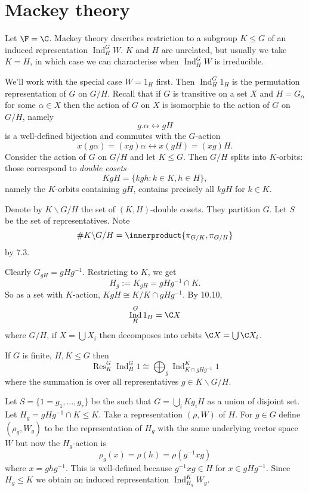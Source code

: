\documentclass[a4paper]{article}
\newcommand*{\ip}{\innerproduct} %
\DeclareMathOperator{\Res}{Res} %
\DeclareMathOperator{\Ind}{Ind} %
\theoremstyle{definition}
\begin{document}
\section{Mackey theory}

Let \(\F = \C\). Mackey theory describes restriction to a subgroup \(K \leq G\) of an induced representation \(\Ind_H^G W\). \(K\) and \(H\) are unrelated, but usually we take \(K = H\), in which case we can characterise when \(\Ind_H^G W\) is irreducible.

We'll work with the special case \(W = 1_H\) first. Then \(\Ind_H^G 1_H\) is the permutation representation of \(G\) on \(G/H\). Recall that if \(G\) is transitive on a set \(X\) and \(H = G_\alpha\) for some \(\alpha \in X\) then the action of \(G\) on \(X\) is isomorphic to the action of \(G\) on \(G/H\), namely
\[
  g . \alpha \leftrightarrow gH
  \tag{*, 12. 1}
\]
is a well-defined bijection and commutes with the \(G\)-action
\[
  x(g\alpha) = (xg) \alpha \leftrightarrow x(gH) = (xg)H.
\]
Consider the action of \(G\) on \(G/H\) and let \(K \leq G\). Then \(G/H\) splits into \(K\)-orbits: those correspond to \emph{double cosets}
\[
  KgH = \{kgh: k \in K, h \in H\},
\]
namely the \(K\)-orbits containing \(gH\), contains precisely all \(kgH\) for \(k \in K\).

\begin{notation}
  Denote by \(K \backslash G/H\) the set of \((K, H)\)-double cosets. They partition \(G\). Let \(S\) be the set of representatives. Note
  \[
    \# K \backslash G /H = \ip{\pi_{G/K}, \pi_{G/H}}
  \]
  by 7.3.
\end{notation}

  Clearly \(G_{gH} = gHg^{-1}\). Restricting to \(K\), we get
  \[
    H_g := K_{gH} = gHg^{-1} \cap K.
  \]
  So as a set with \(K\)-action, \(KgH \cong K/K \cap gHg^{-1}\). By 10.10,
  \[
    \Ind_H^G 1_H = \C X
  \]
where \(G/H\), if \(X = \bigcup X_i\) then decomposes into orbits \(\C X = \bigcup \C X_i\).

\begin{proposition}
  If \(G\) is finite, \(H, K \leq G\) then
  \[
    \Res_K^G \Ind_H^G 1 \cong \bigoplus_g \Ind_{K \cap gHg^{-1}}^K 1
  \]
  where the summation is over all representatives \(g \in K \backslash G/H\).
\end{proposition}

Let \(S = \{1 = g_1, \dots, g_r\}\) be the such that \(G = \bigcup_i Kg_iH\) as a union of disjoint set. Let \(H_g = gHg^{-1} \cap K \leq K\). Take a representation \((\rho, W)\) of \(H\). For \(g \in G\) define \((\rho_g, W_g)\) to be the representation of \(H_g\) with the same underlying vector space \(W\) but now the \(H_g\)-action is
\[
  \rho_g(x) = \rho(h) = \rho(g^{-1}xg)
\]
where \(x = ghg^{-1}\). This is well-defined because \(g^{-1}xg \in H\) for \(x \in gHg^{-1}\). Since \(H_g \leq K\) we obtain an induced representation \(\Ind_{H_g}^K W_g\).
\end{document}
